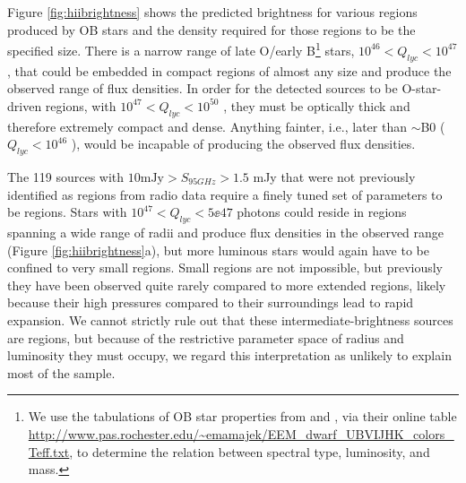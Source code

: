 \documentclass[twocolumn]{aastex61}
\begin{document}
Figure \ref{fig:hiibrightness} shows the predicted brightness for various \hii
regions produced by OB stars and the density required for those \hii regions
to be the specified size.  There is a narrow range of late O/early B\footnote{We use
the tabulations of OB star properties from \citet{Vacca1996a} and
\citet{Pecaut2013a}, via their online table
\url{http://www.pas.rochester.edu/~emamajek/EEM_dwarf_UBVIJHK_colors_Teff.txt},
to determine the relation between spectral type, luminosity, and mass.} stars,
$10^{46} < Q_{lyc} < 10^{47}$ \pers, that could be embedded in compact \hii
regions of almost any size and produce the observed range of flux densities.
In order for the detected sources to be O-star-driven \hii regions, with $10^{47}
< Q_{lyc} < 10^{50}$ \pers, they must be optically thick and therefore
extremely compact and dense.  
Anything fainter, i.e., later than $\sim$B0 ($Q_{lyc}<10^{46}$ \pers), would be
incapable of producing the observed flux densities.




The 119 sources with $10 \mathrm{mJy} > S_{95 GHz} > 1.5$ mJy that were not
previously identified as \hii regions from radio data require a finely tuned set of
parameters to be \hii regions.  Stars with $10^{47} < Q_{lyc} < 5\ee{47}$ photons
could reside in \hii regions spanning a wide range of radii and produce
flux densities in the observed range (Figure \ref{fig:hiibrightness}a),
but more luminous stars would again have to be confined to very small \hii
regions.  Small \hii regions are not impossible, but previously they have
been observed quite rarely compared to more extended \hii regions, likely
because their high pressures compared to their surroundings lead to rapid
expansion.  We cannot strictly rule out that these intermediate-brightness
sources are \hii regions, but because of the restrictive parameter space
of radius and luminosity they must occupy, we regard this interpretation
as unlikely to explain most of the sample.
\end{document}
